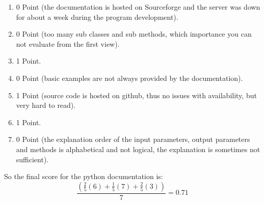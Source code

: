 \documentclass{article}
\begin{document}
\begin{enumerate}
    \item 0 Point (the documentation is hosted on Sourceforge and the server was down for about a week during the program development).
    \item 0 Point (too many sub classes and sub methods, which importance you can not evaluate from the first view).
    \item 1 Point.
    \item 0 Point (basic examples are not always provided by the documentation).
    \item 1 Point (source code is hosted on github, thus no issues with availability, but very hard to read).
    \item 1 Point.
    \item 0 Point (the explanation order of the input parameters, output parameters and methods is alphabetical and not logical, the explanation is sometimes not sufficient).
\end{enumerate}
So the final score for the python documentation is:
\[ \frac{(\frac{2}{5}(6) + \frac{1}{5}(7) + \frac{2}{5}(3) )}{7}= 0.71\]
\end{document}
